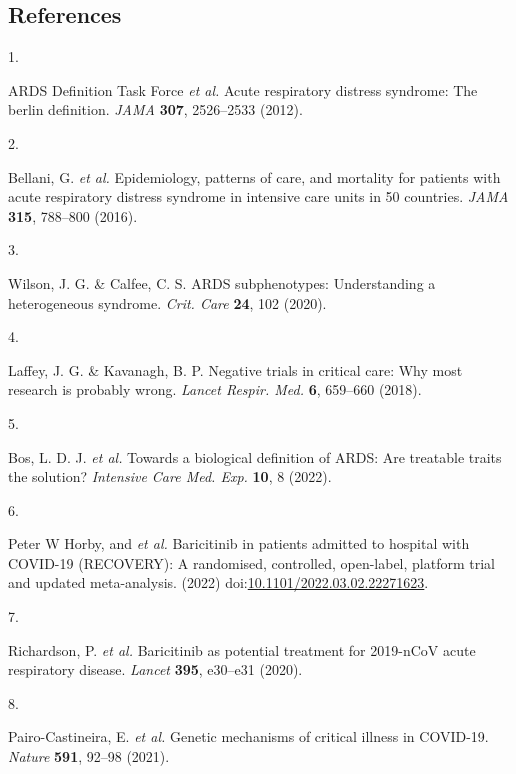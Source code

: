 \documentclass[
  11,
  a4paper,
]{article}
\newlength{\cslhangindent}
\newlength{\csllabelwidth}
\newenvironment{CSLReferences}[2] %
 {\begin{list}{}{%
  \setlength{\itemindent}{0pt}
  \setlength{\leftmargin}{0pt}
  \setlength{\parsep}{0pt}
  \ifodd #1
   \setlength{\leftmargin}{\cslhangindent}
   \setlength{\itemindent}{-1\cslhangindent}
  \fi
  \setlength{\itemsep}{#2\baselineskip}}}
 {\end{list}}
\newcommand{\CSLLeftMargin}[1]{\parbox[t]{\csllabelwidth}{\strut#1\strut}}
\newcommand{\CSLRightInline}[1]{\parbox[t]{\linewidth - \csllabelwidth}{\strut#1\strut}}
\begin{document}
\newpage

\subsection{References}\label{references}

\label{refs}
\begin{CSLReferences}{0}{0}
\CSLLeftMargin{1. }%
\CSLRightInline{ARDS Definition Task Force \emph{et al.} Acute
respiratory distress syndrome: The berlin definition. \emph{JAMA}
\textbf{307}, 2526--2533 (2012).}

\CSLLeftMargin{2. }%
\CSLRightInline{Bellani, G. \emph{et al.} Epidemiology, patterns of
care, and mortality for patients with acute respiratory distress
syndrome in intensive care units in 50 countries. \emph{JAMA}
\textbf{315}, 788--800 (2016).}

\CSLLeftMargin{3. }%
\CSLRightInline{Wilson, J. G. \& Calfee, C. S. {ARDS} subphenotypes:
Understanding a heterogeneous syndrome. \emph{Crit. Care} \textbf{24},
102 (2020).}

\CSLLeftMargin{4. }%
\CSLRightInline{Laffey, J. G. \& Kavanagh, B. P. Negative trials in
critical care: Why most research is probably wrong. \emph{Lancet Respir.
Med.} \textbf{6}, 659--660 (2018).}

\CSLLeftMargin{5. }%
\CSLRightInline{Bos, L. D. J. \emph{et al.} Towards a biological
definition of {ARDS}: Are treatable traits the solution? \emph{Intensive
Care Med. Exp.} \textbf{10}, 8 (2022).}

\CSLLeftMargin{6. }%
\CSLRightInline{Peter W Horby, and \emph{et al.} Baricitinib in patients
admitted to hospital with {COVID}-19 ({RECOVERY}): A randomised,
controlled, open-label, platform trial and updated meta-analysis. (2022)
doi:\href{https://doi.org/10.1101/2022.03.02.22271623}{10.1101/2022.03.02.22271623}.}

\CSLLeftMargin{7. }%
\CSLRightInline{Richardson, P. \emph{et al.} {{B}aricitinib as potential
treatment for 2019-n{C}o{V} acute respiratory disease}. \emph{Lancet}
\textbf{395}, e30--e31 (2020).}

\CSLLeftMargin{8. }%
\CSLRightInline{Pairo-Castineira, E. \emph{et al.} Genetic mechanisms of
critical illness in {COVID-19}. \emph{Nature} \textbf{591}, 92--98
(2021).}


\end{CSLReferences}
\end{document}
